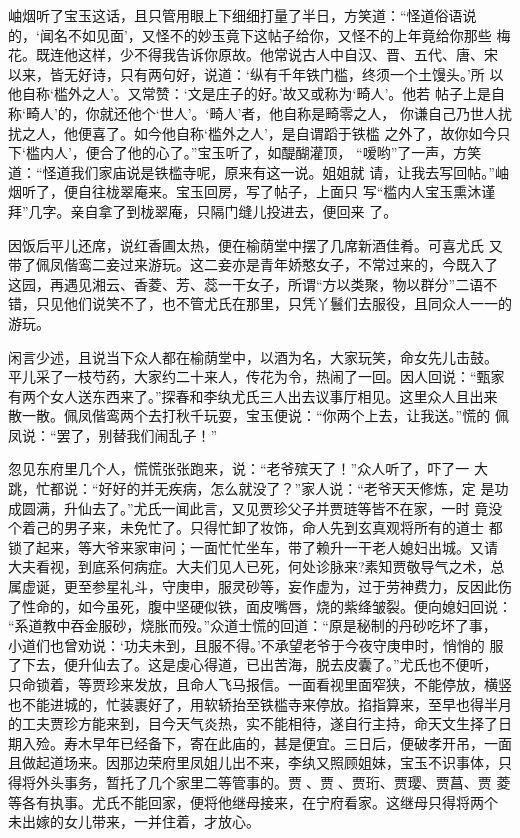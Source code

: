 岫烟听了宝玉这话，且只管用眼上下细细打量了半日，方笑道：“怪道俗语说
的，‘闻名不如见面’，又怪不的妙玉竟下这帖子给你，又怪不的上年竟给你那些
梅花。既连他这样，少不得我告诉你原故。他常说古人中自汉、晋、五代、唐、宋
以来，皆无好诗，只有两句好，说道：‘纵有千年铁门槛，终须一个土馒头。’所
以他自称‘槛外之人’。又常赞：‘文是庄子的好。’故又或称为‘畸人’。他若
帖子上是自称‘畸人’的，你就还他个‘世人’。‘畸人’者，他自称是畸零之人，
你谦自己乃世人扰扰之人，他便喜了。如今他自称‘槛外之人’，是自谓蹈于铁槛
之外了，故你如今只下‘槛内人’，便合了他的心了。”宝玉听了，如醍醐灌顶，
“嗳哟”了一声，方笑道：“怪道我们家庙说是铁槛寺呢，原来有这一说。姐姐就
请，让我去写回帖。”岫烟听了，便自往栊翠庵来。宝玉回房，写了帖子，上面只
写“槛内人宝玉熏沐谨拜”几字。亲自拿了到栊翠庵，只隔门缝儿投进去，便回来
了。

因饭后平儿还席，说红香圃太热，便在榆荫堂中摆了几席新酒佳肴。可喜尤氏
又带了佩凤偕鸾二妾过来游玩。这二妾亦是青年娇憨女子，不常过来的，今既入了
这园，再遇见湘云、香菱、芳、蕊一干女子，所谓“方以类聚，物以群分”二语不
错，只见他们说笑不了，也不管尤氏在那里，只凭丫鬟们去服役，且同众人一一的
游玩。

闲言少述，且说当下众人都在榆荫堂中，以酒为名，大家玩笑，命女先儿击鼓。
平儿采了一枝芍药，大家约二十来人，传花为令，热闹了一回。因人回说：“甄家
有两个女人送东西来了。”探春和李纨尤氏三人出去议事厅相见。这里众人且出来
散一散。佩凤偕鸾两个去打秋千玩耍，宝玉便说：“你两个上去，让我送。”慌的
佩凤说：“罢了，别替我们闹乱子！”

忽见东府里几个人，慌慌张张跑来，说：“老爷殡天了！”众人听了，吓了一
大跳，忙都说：“好好的并无疾病，怎么就没了？”家人说：“老爷天天修炼，定
是功成圆满，升仙去了。”尤氏一闻此言，又见贾珍父子并贾琏等皆不在家，一时
竟没个着己的男子来，未免忙了。只得忙卸了妆饰，命人先到玄真观将所有的道士
都锁了起来，等大爷来家审问；一面忙忙坐车，带了赖升一干老人媳妇出城。又请
大夫看视，到底系何病症。大夫们见人已死，何处诊脉来?素知贾敬导气之术，总
属虚诞，更至参星礼斗，守庚申，服灵砂等，妄作虚为，过于劳神费力，反因此伤
了性命的，如今虽死，腹中坚硬似铁，面皮嘴唇，烧的紫绛皱裂。便向媳妇回说：
“系道教中吞金服砂，烧胀而殁。”众道士慌的回道：“原是秘制的丹砂吃坏了事，
小道们也曾劝说：‘功夫未到，且服不得。’不承望老爷于今夜守庚申时，悄悄的
服了下去，便升仙去了。这是虔心得道，已出苦海，脱去皮囊了。”尤氏也不便听，
只命锁着，等贾珍来发放，且命人飞马报信。一面看视里面窄狭，不能停放，横竖
也不能进城的，忙装裹好了，用软轿抬至铁槛寺来停放。掐指算来，至早也得半月
的工夫贾珍方能来到，目今天气炎热，实不能相待，遂自行主持，命天文生择了日
期入殓。寿木早年已经备下，寄在此庙的，甚是便宜。三日后，便破孝开吊，一面
且做起道场来。因那边荣府里凤姐儿出不来，李纨又照顾姐妹，宝玉不识事体，只
得将外头事务，暂托了几个家里二等管事的。贾、贾、贾珩、贾璎、贾菖、贾
菱等各有执事。尤氏不能回家，便将他继母接来，在宁府看家。这继母只得将两个
未出嫁的女儿带来，一并住着，才放心。

